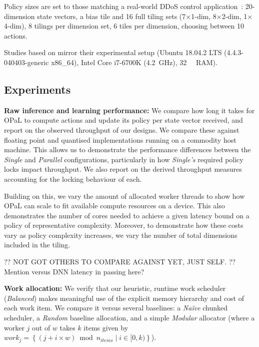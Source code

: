 \documentclass[sigconf,natbib=false]{acmart}
\newcommand{\fakepara}[1]{\noindent\textbf{#1:}}
\newcommand{\approachshort}{OPaL}
\begin{document}
Policy sizes are set to those matching a real-world DDoS control application~\parencite{DBLP:journals/tnsm/SimpsonRP20}: 20-dimension state vectors, a bias tile and 16 full tiling sets (7$\times$1-dim, 8$\times$2-dim, 1$\times$4-dim), 8 tilings per dimension set, 6 tiles per dimension, choosing between 10 actions.

Studies based on \textcite{DBLP:journals/tnsm/SimpsonRP20} mirror their experimental setup (Ubuntu 18.04.2 LTS (4.4.3-040403-generic x86\_64), Intel Core i7-6700K (\SI{4.2}{\giga\hertz}), \SI{32}{\gibi\byte} RAM).

\subsection{Experiments}

\fakepara{Raw inference and learning performance}
We compare how long it takes for \approachshort{} to compute actions and update its policy per state vector received, and report on the observed throughput of our designs.
We compare these against floating point and quantised implementations running on a commodity host machine.
This allows us to demonstrate the performance differences between the \emph{Single} and \emph{Parallel} configurations, particularly in how \emph{Single's} required policy locks impact throughput.
We also report on the derived throughput measures accounting for the locking behaviour of each.

Building on this, we vary the amount of allocated worker threads to show how \approachshort{} can scale to fit available compute resources on a device.
This also demonstrates the number of cores needed to achieve a given latency bound on a policy of representative complexity.
Moreover, to demonstrate how these costs vary as policy complexity increases, we vary the number of total dimensions included in the tiling.

?? NOT GOT OTHERS TO COMPARE AGAINST YET, JUST SELF.
?? Mention versus DNN latency in passing here?

\fakepara{Work allocation}
We verify that our heuristic, runtime work scheduler (\emph{Balanced}) makes meaningful use of the explicit memory hierarchy and cost of each work item.
We compare it versus several baselines: a \emph{Na\"{i}ve} chunked scheduler, a \emph{Random} baseline allocation, and a simple \emph{Modular} allocator (where a worker $j$ out of $w$ takes $k$ items given by $\mathit{work}_j=\left\{\left(j + i \times w\right) \bmod n_{\mathit{items}} \mid i \in [0,k) \right\}$).
\end{document}

